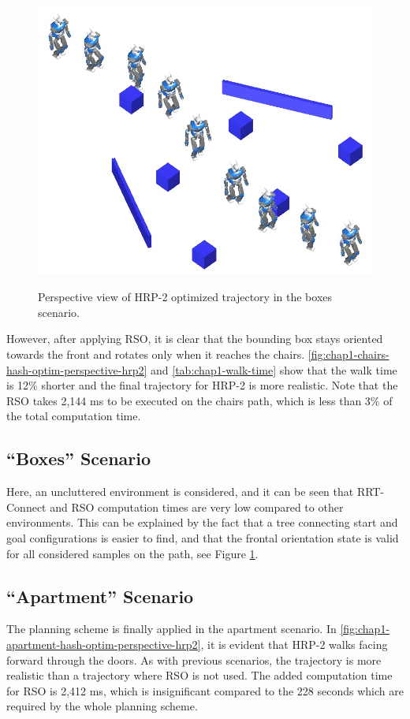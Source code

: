\begin{figure}
  \centering
      {\includegraphics[width = 0.8\linewidth]
        {src/chap1-path-optimization/galton-hash-optim-perspective-hrp2.png}}
      \caption{Perspective view of HRP-2 optimized trajectory in the
        boxes scenario.}
      \label{fig:chap1-galton-hash-optim-perspective-hrp2}
\end{figure}

However, after applying RSO, it is clear that the bounding box stays
oriented towards the front and rotates only when it reaches the
chairs. \autoref{fig:chap1-chairs-hash-optim-perspective-hrp2} and
\autoref{tab:chap1-walk-time} show that the walk time is 12\% shorter
and the final trajectory for HRP-2 is more realistic. Note that the
RSO takes 2,144 ms to be executed on the chairs path, which is less
than 3\% of the total computation time.

\subsection{``Boxes'' Scenario}
Here, an uncluttered environment is considered, and it can be seen
that RRT-Connect and RSO computation times are very low compared to
other environments. This can be explained by the fact that a tree
connecting start and goal configurations is easier to find, and that
the frontal orientation state is valid for all considered samples on
the path, see Figure \ref{fig:chap1-galton-hash-optim-perspective-hrp2}.

\subsection{``Apartment'' Scenario}
The planning scheme is finally applied in the apartment scenario. In
\autoref{fig:chap1-apartment-hash-optim-perspective-hrp2}, it is
evident that HRP-2 walks facing forward through the doors. As with
previous scenarios, the trajectory is more realistic than a trajectory
where RSO is not used. The added computation time for RSO is 2,412 ms,
which is insignificant compared to the 228 seconds which are required
by the whole planning scheme.

